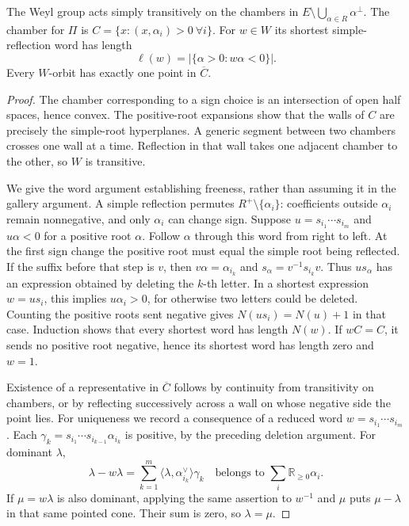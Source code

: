 \begin{theorem}\label{res:E03}
The Weyl group acts simply transitively on the chambers in
\(E\setminus\bigcup_{\alpha\in R}\alpha^\perp\).
The chamber for \(\Pi\) is
\(C=\{x:(x,\alpha_i)>0\ \forall i\}\).
For \(w\in W\) its shortest simple-reflection word has length
\[
 \ell(w)=|\{\alpha>0:w\alpha<0\}|.
\]
Every \(W\)-orbit has exactly one point in \(\overline C\).
\end{theorem}
\begin{proof}
The chamber corresponding to a sign choice is an intersection
of open half spaces, hence convex. The positive-root
expansions show that the walls of \(C\) are precisely the
simple-root hyperplanes. A generic segment between two
chambers crosses one wall at a time. Reflection in that wall
takes one adjacent chamber to the other, so \(W\) is transitive.

We give the word argument establishing freeness, rather than
assuming it in the gallery argument. A simple reflection
permutes \(R^+\setminus\{\alpha_i\}\): coefficients outside
\(\alpha_i\) remain nonnegative, and only \(\alpha_i\)
can change sign. Suppose \(u=s_{i_1}\cdots s_{i_m}\)
and \(u\alpha<0\) for a positive root \(\alpha\).
Follow \(\alpha\) through this word from right to left.
At the first sign change the positive root must equal the
simple root being reflected. If the suffix before that step
is \(v\), then \(v\alpha=\alpha_{i_k}\) and
\(s_\alpha=v^{-1}s_{i_k}v\). Thus \(us_\alpha\)
has an expression obtained by deleting the \(k\)-th letter.
In a shortest expression \(w=us_i\), this implies
\(u\alpha_i>0\), for otherwise two letters could be deleted.
Counting the positive roots sent negative gives
\(N(us_i)=N(u)+1\) in that case. Induction shows that every
shortest word has length \(N(w)\).
If \(wC=C\), it sends no positive root negative, hence its
shortest word has length zero and \(w=1\).

Existence of a representative in \(\overline C\) follows
by continuity from transitivity on chambers, or by reflecting
successively across a wall on whose negative side the point lies.
For uniqueness we record a consequence of a reduced word
\(w=s_{i_1}\cdots s_{i_m}\). Each
\(\gamma_k=s_{i_1}\cdots s_{i_{k-1}}\alpha_{i_k}\)
is positive, by the preceding deletion argument. For dominant
\(\lambda\),
\[
 \lambda-w\lambda
 =\sum_{k=1}^m
   \langle\lambda,\alpha_{i_k}^\vee\rangle\gamma_k
 \quad\text{belongs to }\sum_i\mathbb R_{\ge0}\alpha_i.
\]
If \(\mu=w\lambda\) is also dominant, applying the same
assertion to \(w^{-1}\) and \(\mu\) puts \(\mu-\lambda\)
in that same pointed cone. Their sum is zero, so
\(\lambda=\mu\).
\end{proof}

